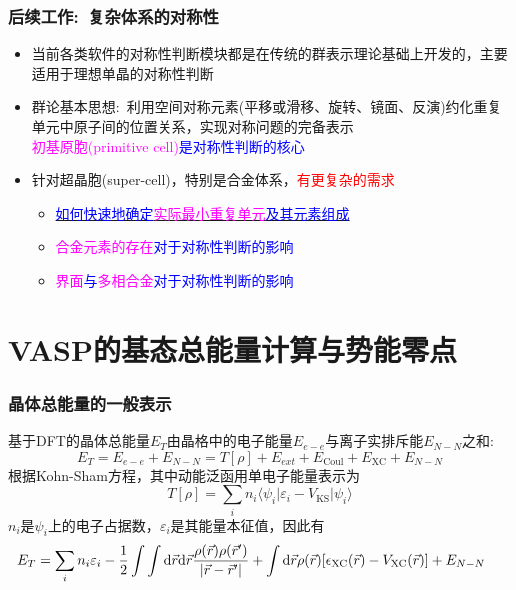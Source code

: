 \documentclass[cjk,slidestop,handout,compress,mathserif,blue]{beamer}	%
\begin{document}
\frame
{
	\frametitle{后续工作:~复杂体系的对称性}
	\begin{itemize}
   		\setlength{\itemsep}{15pt}
		\item 当前各类软件的对称性判断模块都是在传统的群表示理论基础上开发的，主要适用于理想单晶的对称性判断
		\item 群论基本思想:~利用空间对称元素(平移或滑移、旋转、镜面、反演)约化重复单元中原子间的位置关系，实现对称问题的完备表示\\
			\textcolor{blue}{\textcolor{magenta}{初基原胞(\textrm{primitive cell})}是对称性判断的核心}
		\item 针对超晶胞(\textrm{super-cell})，特别是合金体系，\textcolor{red}{有更复杂的需求}
			\begin{itemize}
   				\setlength{\itemsep}{10pt}
				\item \underline{\textcolor{blue}{如何快速地确定\textcolor{magenta}{实际最小重复单元}及其元素组成}}
				\item \textcolor{blue}{\textcolor{magenta}{合金元素的存在}对于对称性判断的影响}
				\item \textcolor{blue}{\textcolor{magenta}{界面}与\textcolor{magenta}{多相合金}对于对称性判断的影响}
			\end{itemize}
	\end{itemize}
}

\section{\rm{VASP}的基态总能量计算与势能零点}
\frame
{
	\frametitle{晶体总能量的一般表示}
基于\textrm{DFT}的晶体总能量$E_T$由晶格中的电子能量$E_{e-e}$与离子实排斥能$E_{N-N}$之和:~
	\begin{displaymath}
		E_T=E_{e-e}+E_{N-N}=T[\rho]+E_{ext}+E_{\mathrm{Coul}}+E_{\mathrm{XC}}+E_{N-N}
	\end{displaymath}
根据\textrm{Kohn-Sham}方程，其中动能泛函用单电子能量表示为
\begin{displaymath}
	T[{\rho}]=\sum_in_i\langle\psi_i|\varepsilon_i-V_{\mathrm{KS}}|\psi_i\rangle
\end{displaymath}
$n_i$是$\psi_i$上的电子占据数，$\varepsilon_i$是其能量本征值，因此有
\begin{displaymath}
	\hspace*{-12.0pt}	E_T=\sum_in_i\varepsilon_i-\dfrac12\int\int\mathrm{d}\vec r\mathrm{d}\vec r\dfrac{\rho(\vec r)\rho(\vec r^{\prime})}{|\vec r-\vec r^{\prime}|}+\int\mathrm{d}\vec r\rho(\vec r)[\epsilon_{\mathrm{XC}}(\vec r)-V_{\mathrm{XC}}(\vec r)]+E_{N-N}
\end{displaymath}
}
\end{document}
